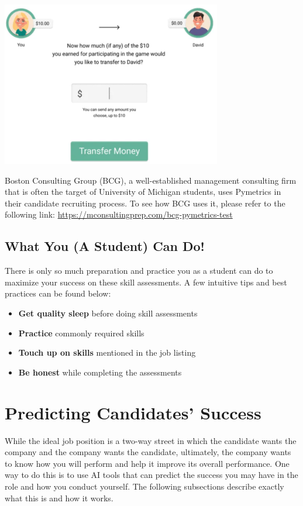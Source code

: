 \documentclass[
]{book}
\begin{document}
\includegraphics[width=3.78125in,height=\textheight]{pymetrics pic1.png}

Boston Consulting Group (BCG), a well-established management consulting firm that is often the target of University of Michigan students, uses Pymetrics in their candidate recruiting process. To see how BCG uses it, please refer to the following link: \url{https://mconsultingprep.com/bcg-pymetrics-test}

\hypertarget{what-you-a-student-can-do-3}{%
\section{What You (A Student) Can Do!}\label{what-you-a-student-can-do-3}}

There is only so much preparation and practice you as a student can do to maximize your success on these skill assessments. A few intuitive tips and best practices can be found below:

\begin{itemize}
\item
  \textbf{Get quality sleep} before doing skill assessments
\item
  \textbf{Practice} commonly required skills
\item
  \textbf{Touch up on skills} mentioned in the job listing
\item
  \textbf{Be honest} while completing the assessments
\end{itemize}

\hypertarget{predicting-candidates-success}{%
\chapter{Predicting Candidates' Success}\label{predicting-candidates-success}}

While the ideal job position is a two-way street in which the candidate wants the company and the company wants the candidate, ultimately, the company wants to know how you will perform and help it improve its overall performance. One way to do this is to use AI tools that can predict the success you may have in the role and how you conduct yourself. The following subsections describe exactly what this is and how it works.
\end{document}
